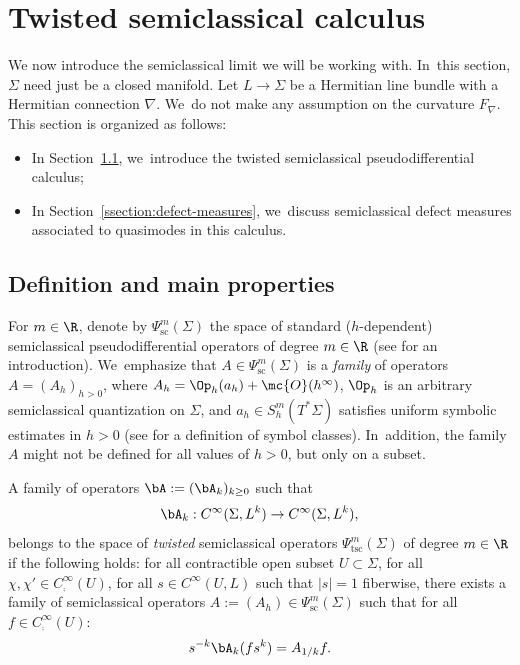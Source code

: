 \section{Twisted semiclassical calculus}

\label{section:microlocal}

We now introduce the semiclassical limit we will be working with. In~this section, $\Sigma$ need just be a closed manifold.
Let $L \to \Sigma$ be a Hermitian line bundle with a Hermitian connection $\nabla$. We~do not
make any assumption on the curvature $F_{\nabla}$. This section is organized as follows:
\begin{itemize}

\item In Section~\ref{ssection:uniform-pseudo}, we~introduce the twisted semiclassical pseudodifferential calculus;

\item In Section~\ref{ssection:defect-measures}, we~discuss semiclassical defect measures associated to quasimodes in this calculus.
\end{itemize}

\subsection{Definition and main properties}

\label{ssection:uniform-pseudo}

For $m \in
\R$, denote by $\Psi^m_{\mathrm{sc}}(\Sigma)$ the space of standard
($h$-dependent) semiclassical pseudodifferential operators of degree $m \in
\R$ (see \cite[Ch.\,14]{Zworski-12} for an introduction). We~emphasize that
$A \in \Psi^m_{\mathrm{sc}}(\Sigma)$ is a \emph{family} of operators $A =
(A_h)_{h > 0}$, where $A_h = \Op_h(a_h) + \mc{O}(h^\infty)$, $\Op_h$ is an
arbitrary semiclassical quantization on $\Sigma$, and $a_h \in
S^m_h(T^*\Sigma)$ satisfies uniform symbolic estimates in $h > 0$ (see \cite[Ch.\,3]{Lefeuvre-book} for a definition of symbol classes). In~addition, the family $A$ might not be defined for all values of $h > 0$, but only on a subset.

\begin{definition}
A family of operators $\bA := (\bA_k)_{k \geq 0}$ such that
\[
\bA_{k} : C^\infty(\Sigma, L^{k}) \to C^\infty(\Sigma, L^{k}),
\]
belongs to the space of \emph{twisted} semiclassical operators $\Psi^m_{\mathrm{tsc}}(\Sigma)$ of degree $m \in \R$ if the following holds: for all contractible open subset $U \subset \Sigma$, for all $\chi,\chi' \in C^\infty_{{\comp}}(U)$, for all $s \in C^\infty(U,L)$ such that $|s|=1$ fiberwise, there exists a family of semiclassical operators $A := (A_h) \in \Psi^m_{\mathrm{sc}}(\Sigma)$ such that for all $f \in C^\infty_{{\comp}}(U)$:
\begin{equation}
\label{equation:def}
s^{-k}\bA_k(f s^{k}) = A_{1/k} f.
\end{equation}
\end{definition}

